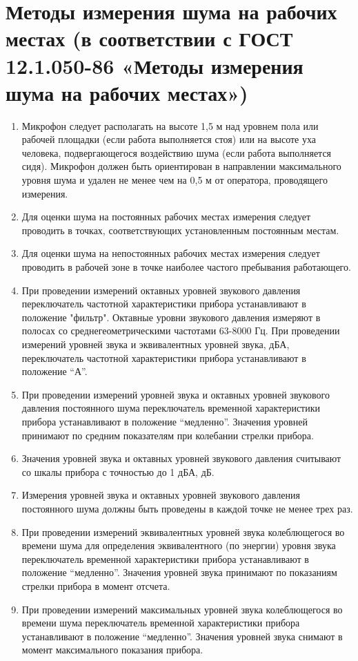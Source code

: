 \documentclass[a5paper, 12pt, twoside]{article}
\begin{document}
\section{Методы измерения шума на рабочих местах (в соответствии с ГОСТ 12.1.050-86 «Методы измерения шума на рабочих местах»)}
\begin{enumerate}
    \item Микрофон следует располагать на высоте 1,5 м над уровнем пола или рабочей площадки (если работа выполняется стоя) или на высоте уха человека, подвергающегося воздействию шума (если работа выполняется сидя). Микрофон должен быть ориентирован в направлении максимального уровня шума и удален не менее чем на 0,5 м от оператора, проводящего измерения.
    \item Для оценки шума на постоянных рабочих местах измерения следует проводить в точках, соответствующих установленным постоянным местам.
    \item Для оценки шума на непостоянных рабочих местах измерения следует проводить в рабочей зоне в точке наиболее частого пребывания работающего.
    \item При проведении измерений октавных уровней звукового давления переключатель частотной характеристики прибора устанавливают в положение "фильтр". Октавные уровни звукового давления измеряют в полосах со среднегеометрическими частотами 63-8000 Гц. При проведении измерений уровней звука и эквивалентных уровней звука, дБА, переключатель частотной характеристики прибора устанавливают в положение ``А''.
    \item При проведении измерений уровней звука и октавных уровней звукового давления постоянного шума переключатель временной характеристики прибора устанавливают в положение ``медленно''. Значения уровней принимают по средним показателям при колебании стрелки прибора.
    \item Значения уровней звука и октавных уровней звукового давления считывают со шкалы прибора с точностью до 1 дБА, дБ.
    \item Измерения уровней звука и октавных уровней звукового давления постоянного шума должны быть проведены в каждой точке не менее трех раз.
    \item При проведении измерений эквивалентных уровней звука колеблющегося во времени шума для определения эквивалентного (по энергии) уровня звука переключатель временной характеристики прибора устанавливают в положение ``медленно''. Значения уровней звука принимают по показаниям стрелки прибора в момент отсчета.
    \item При проведении измерений максимальных уровней звука колеблющегося во времени шума переключатель временной характеристики прибора устанавливают в положение ``медленно''. Значения уровней звука снимают в момент максимального показания прибора.

\end{enumerate}
\end{document}
